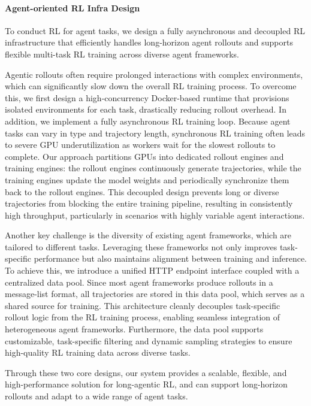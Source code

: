 \documentclass{article}
\theoremstyle{definition}
\begin{document}
\paragraph{Agent-oriented RL Infra Design}

To conduct RL for agent tasks, we design a fully asynchronous and decoupled RL infrastructure that efficiently handles long-horizon agent rollouts and supports flexible multi-task RL training across diverse agent frameworks.

Agentic rollouts often require prolonged interactions with complex environments, which can significantly slow down the overall RL training process. To overcome this, we first design a high-concurrency Docker-based runtime that provisions isolated environments for each task, drastically reducing rollout overhead. In addition, we implement a fully asynchronous RL training loop. Because agent tasks can vary in type and trajectory length, synchronous RL training often leads to severe GPU underutilization as workers wait for the slowest rollouts to complete. Our approach partitions GPUs into dedicated rollout engines and training engines: the rollout engines continuously generate trajectories, while the training engines update the model weights and periodically synchronize them back to the rollout engines. This decoupled design prevents long or diverse trajectories from blocking the entire training pipeline, resulting in consistently high throughput, particularly in scenarios with highly variable agent interactions.

Another key challenge is the diversity of existing agent frameworks, which are tailored to different tasks. Leveraging these frameworks not only improves task-specific performance but also maintains alignment between training and inference. To achieve this, we introduce a unified HTTP endpoint interface coupled with a centralized data pool. Since most agent frameworks produce rollouts in a message-list format, all trajectories are stored in this data pool, which serves as a shared source for training. This architecture cleanly decouples task-specific rollout logic from the RL training process, enabling seamless integration of heterogeneous agent frameworks. Furthermore, the data pool supports customizable, task-specific filtering and dynamic sampling strategies to ensure high-quality RL training data across diverse tasks.

Through these two core designs, our system provides a scalable, flexible, and high-performance solution for long-agentic RL, and can support long-horizon rollouts and adapt to a wide range of agent tasks.
\end{document}
